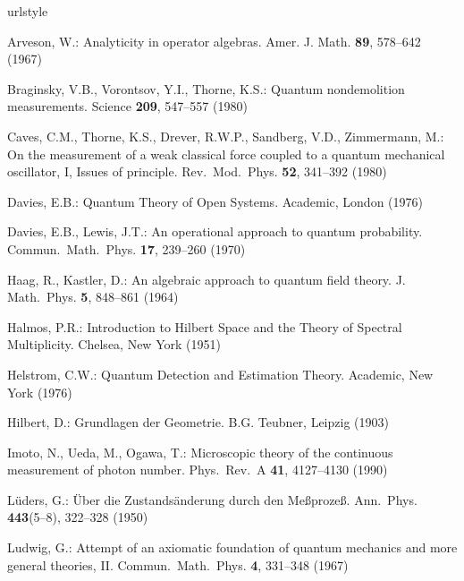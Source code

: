 \documentclass[12pt]{article}
\begin{document}
\begin{thebibliography}{10}
\providecommand{\url}[1]{{#1}}
\providecommand{\urlprefix}{URL }
\expandafter\ifx\csname urlstyle\endcsname\relax
  \providecommand{\doi}[1]{DOI~\discretionary{}{}{}#1}\else
  \providecommand{\doi}{DOI~\discretionary{}{}{}\begingroup
  \urlstyle{rm}\Url}\fi

Arveson, W.: Analyticity in operator algebras.
\newblock Amer. J. Math. \textbf{{89}}, 578--642 (1967)

Braginsky, V.B., Vorontsov, Y.I., Thorne, K.S.: Quantum nondemolition
  measurements.
\newblock Science \textbf{{209}}, 547--557 (1980)

Caves, C.M., Thorne, K.S., Drever, R.W.P., Sandberg, V.D., Zimmermann, M.: On
  the measurement of a weak classical force coupled to a quantum mechanical
  oscillator, {I}, {Issues} of principle.
\newblock Rev.\ Mod.\ Phys. \textbf{{52}}, 341--392 (1980)

Davies, E.B.: Quantum Theory of Open Systems.
\newblock Academic, London (1976)

Davies, E.B., Lewis, J.T.: An operational approach to quantum probability.
\newblock Commun.\ Math.\ Phys. \textbf{{17}}, 239--260 (1970)

Haag, R., Kastler, D.: An algebraic approach to quantum field theory.
\newblock J. Math.\ Phys. \textbf{{5}}, 848--861 (1964)

Halmos, P.R.: Introduction to {Hilbert} Space and the Theory of Spectral
  Multiplicity.
\newblock Chelsea, New York (1951)

Helstrom, C.W.: Quantum Detection and Estimation Theory.
\newblock Academic, New York (1976)

Hilbert, D.: Grundlagen der Geometrie.
\newblock B.G. Teubner, Leipzig (1903)

Imoto, N., Ueda, M., Ogawa, T.: Microscopic theory of the continuous
  measurement of photon number.
\newblock Phys.\ Rev.\ A \textbf{{41}}, 4127--4130 (1990)

{L\"{u}ders}, G.: \"{U}ber die {Zustands\"{a}nderung} durch den
  {Me{\ss}proze{\ss}}.
\newblock Ann.\ Phys. \textbf{443}(5--8), 322--328 (1950)

Ludwig, G.: Attempt of an axiomatic foundation of quantum mechanics and more
  general theories, {II}.
\newblock Commun.\ Math.\ Phys. \textbf{{4}}, {331--348} (1967)


\end{thebibliography}
\end{document}
